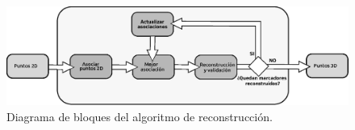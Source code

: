 \begin{figure}
    \begin{center}
        \includegraphics[scale=0.55]{./imagenes/Reconstruccion/bloques_reconstruccion}
        \caption{Diagrama de bloques del algoritmo de reconstrucción.}
        \label{fig: diagrama algoritmo}
    \end{center}
\end{figure}


